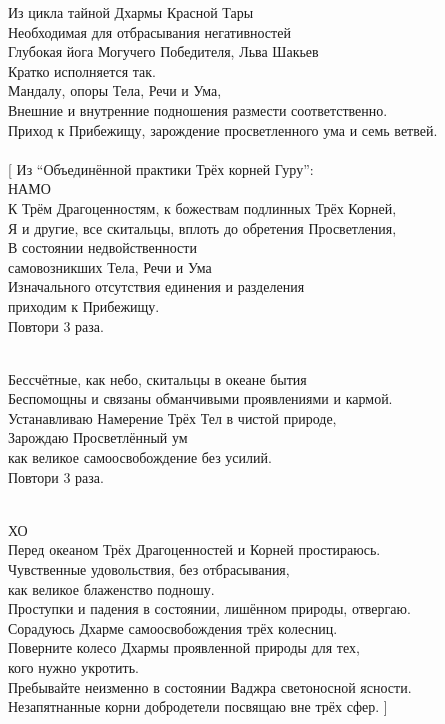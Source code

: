 \scriptsize
Из цикла тайной Дхармы Красной Тары\\
Необходимая для отбрасывания негативностей \\
Глубокая йога Могучего Победителя, Льва Шакьев\\
Кратко исполняется так.\\
Мандалу, опоры Тела, Речи и Ума,\\
Внешние и внутренние подношения размести соответственно.\\
Приход к Прибежищу, зарождение просветленного ума и семь ветвей.\\
\\
\Vspace{1cm}
\normalsize
[ \scriptsize Из “Объединённой практики Трёх корней Гуру”: \normalsize
{}
\\

НАМО\\
К Трём Драгоценностям, к божествам подлинных Трёх Корней,\\
Я и другие, все скитальцы, вплоть до обретения Просветления,\\
В состоянии недвойственности \\ \indent самовозникших Тела, Речи и Ума\\
Изначального отсутствия единения и разделения \\ \indent приходим к Прибежищу.\\
\scriptsize
\indent Повтори 3 раза.
\normalsize

\\
Бессчётные, как небо, скитальцы в океане бытия\\
Беспомощны и связаны обманчивыми проявлениями и кармой.\\
Устанавливаю Намерение Трёх Тел в чистой природе, \\
Зарождаю Просветлённый ум \\ \indent как великое самоосвобождение без усилий. \\
\scriptsize
\indent Повтори 3 раза.\\
\normalsize

\\

ХО\\
Перед океаном Трёх Драгоценностей и Корней простираюсь.\\
Чувственные удовольствия, без отбрасывания, \\ \indent как великое блаженство подношу.\\
Проступки и падения в состоянии, лишённом природы, отвергаю.\\
Сорадуюсь Дхарме самоосвобождения трёх колесниц.\\
Поверните колесо Дхармы проявленной природы для тех, \\ \indent кого нужно укротить.\\
Пребывайте неизменно в состоянии Ваджра светоносной ясности.\\
Незапятнанные корни добродетели посвящаю вне трёх сфер. ]\\


